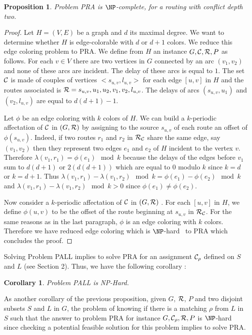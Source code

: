 \documentclass[a4paper,10pt]{article}
\newtheorem{proposition}{Proposition}
\newtheorem{corollary}{Corollary}
\begin{document}
 \begin{proposition}
Problem PRA is $\NP$-complete, for a routing with conflict depth two.
\end{proposition}
 \begin{proof}
  Let $H=(V,E)$ be a graph and $d$ its maximal degree. We want to determine whether $H$ is edge-colorable
  with $d$ or $d+1$ colors. We reduce this edge coloring problem to PRA. We define  from $H$ an instance $G,{\cal C}, {\cal R}, P$ as follows. For each 
  $v \in V$ there are two vertices in $G$  connected by an arc $(v_1,v_2)$ and none of these arcs are incident. The delay of these arcs is equal to $1$.
  The set $\cal C$ is made of couples of vertices $<s_{u,v}, l_{u,v}>$ for each edge $[u,v]$ in $H$ and the routes associated is ${\cal R} =s_{u,v},u_1,u_2,v_1,v_2,l_{u,v}$.  The delays of arcs $(s_{u,v},u_1)$ and $(v_2,l_{u,v})$ are equal to $d(d+1)-1$.  
    
  Let $\phi$ be an edge coloring with $k$ colors of $H$. We can build a $k$-periodic affectation of $\cal C$ in $(G,{\cal R})$
  by assigning to the source $s_{u,v}$ of each route an offset  of $\phi(s_{u,v})$. Indeed, 
  if two routes $r_1$ and $r_2$ in ${\cal R}_{\cal C}$ share the same edge, say $(v_1,v_2)$ then they represent two edges $e_1$ and $e_2$ of $H$ incident  
  to the vertex $v$. Therefore $\lambda(v_1,r_1) = \phi(e_1) \mod k$ because the delays of the edges before $v_1$ sum to $d(d+1)$ or 
  $2(d(d+1))$ which are equal to $0$ modulo $k$ since $k=d$ or $k=d+1$. Thus $\lambda(v_1,r_1) - \lambda(v_1,r_2) \mod k = \phi(e_1) - \phi(e_2) \mod k$
  and $\lambda(v_1,r_1) - \lambda(v_1,r_2) \mod k > 0$ since $\phi(e_1) \neq \phi(e_2) $.
  
  Now consider a $k$-periodic affectation of $\cal C$ in $(G,{\cal R})$ . For each $[u,v]$ in $H$, we define $\phi(u,v)$ to be the offset of the route
  beginning at $s_{u,v}$ in ${\cal R}_{\cal C}$. For the same reasons as in the last paragraph, $\phi$ is an edge coloring with $k$ colors.
  Therefore we have reduced edge coloring which is $\NP$-hard~\cite{holyer1981np} to PRA which concludes the proof. 
 \end{proof}
Solving Problem PALL implies to solve PRA for an assignment ${\cal C}_{\rho}$ defined on $S$ and $L$ (see Section 2). Thus, we have the following corollary :

\begin{corollary}
Problem PALL is NP-Hard.
\end{corollary}

As another corollary of the previous proposition,  given $G$, $\cal R$, $P$ and two disjoint subsets $S$ and $L$ in $G$, the problem of  knowing if there is a matching $\rho$  from $L$ in $S$ such that the answer to problem PRA for instance $G,{\cal C_{\rho}},{\cal R}, P$ is  $\NP$-hard since checking a potential feasible solution for this problem implies to solve PRA.\\
\end{document}
